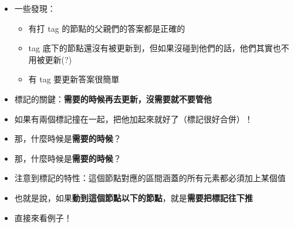 \documentclass[standalone]{beamer}
\begin{document}
\begin{frame}[fragile]{}
  \begin{itemize}
    \item 一些發現：
      \begin{itemize}
        \item 有打 tag 的節點的父親們的答案都是正確的
        \item tag 底下的節點還沒有被更新到，但如果沒碰到他們的話，他們其實也不用被更新(?)
        \item 有 tag 要更新答案很簡單
      \end{itemize}
    \item 標記的關鍵：\textbf{需要的時候再去更新，沒需要就不要管他}
    \item 如果有兩個標記撞在一起，把他加起來就好了（標記很好合併）！
    \item 那，什麼時候是\textbf{需要的時候}？
  \end{itemize}
\end{frame}

\begin{frame}[fragile]{}
  \begin{itemize}
    \item 那，什麼時候是\textbf{需要的時候}？
    \item 注意到標記的特性：這個節點對應的區間涵蓋的所有元素都必須加上某個值
    \item 也就是說，如果\textbf{動到這個節點以下的節點}，就是\textbf{需要把標記往下推}
    \item 直接來看例子！
  \end{itemize}
\end{frame}
\end{document}
